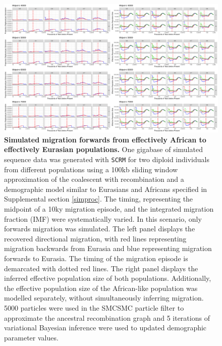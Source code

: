 \begin{figure}
	\centering
	\includegraphics[width=\textwidth]{plot/forward_different_starts.pdf}
	\caption[Simulated migration forwards from effectively African to effectively Eurasian populations]{{\bf Simulated migration forwards from effectively African to effectively Eurasian populations.} One gigabase of simulated sequence data was generated with {\tt SCRM} for two diploid individuals from different populations using a 100kb sliding window approximation of the coalescent with recombination and a demographic model similar to Eurasians and Africans specified in Supplemental section \ref{simproc}. The timing, representing the midpoint of a 10ky migration episode, and the integrated migration fraction (IMF) were systematically varied. In this scenario, only forwards migration was simulated. The left panel displays the recovered directional migration, with red lines representing migration backwards from Eurasia and blue representing migration forwards to Eurasia. The timing of the migration episode is demarcated with dotted red lines. The right panel displays the inferred effective population size of both populations. Additionally, the effective population size of the African-like population was modelled separately, without simultaneously inferring migration. 5000 particles were used in the SMCSMC particle filter to approximate the ancestral recombination graph and 5 iterations of variational Bayesian inference were used to updated demographic parameter values.}
	\label{fig:fwdsim}
\end{figure}


